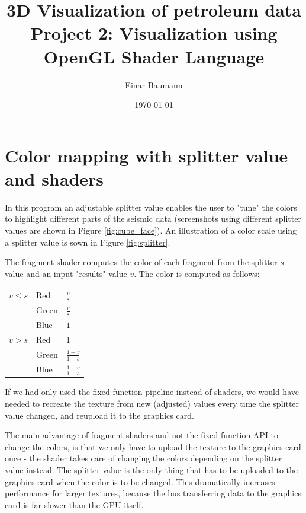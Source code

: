 \documentclass[a4paper, english, 12pt]{article}
\title{3D Visualization of petroleum data\\ 
\vspace{6pt}\large Project 2: Visualization using OpenGL Shader Language 
\\ 
 }
\author{Einar Baumann}
\date{\today}
\begin{document}
\maketitle
\thispagestyle{empty}
\pagebreak


\section{Color mapping with splitter value and shaders}
\label{sec:color_mapping}

In this program an adjustable splitter value enables the user to "tune" the colors to highlight different parts of the seismic data (screenshots using different splitter values are shown in Figure \ref{fig:cube_face}). An illustration of a color scale using a splitter value is sown in Figure \ref{fig:splitter}. 

The fragment shader computes the color of each fragment from the splitter $s$ value and an input "results" value $v$. The color is computed as follows:

\begin{center}
\begin{tabular}{lll}
	\toprule
	$v \leq s$ 	& Red 	& $\frac{v}{s}$ \\
				& Green	& $\frac{v}{s}$ \\
				& Blue	& $1$ \\
	\midrule
	$v > s$		& Red 	& 1 \\
				& Green & $\frac{1-v}{1-s}$ \\
				& Blue 	& $\frac{1-v}{1-s}$ \\
	\bottomrule
\end{tabular}
\end{center}

If we had only used the fixed function pipeline instead of shaders, we would have needed to recreate the texture from new (adjusted) values every time the splitter value changed, and reupload it to the graphics card.

The main advantage of fragment shaders and not the fixed function API to change the colors, is that we only have to upload the texture to the graphics card once - the shader takes care of changing the colors depending on the splitter value instead. The splitter value is the only thing that has to be uploaded to the graphics card when the color is to be changed. This dramatically increases performance for larger textures, because the bus transferring data to the graphics card is far slower than the GPU itself.
\end{document}
